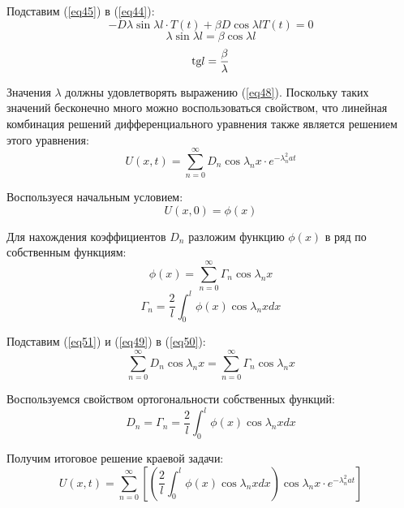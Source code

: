 Подставим (\ref{eq45}) в (\ref{eq44}):
\begin{equation}
    \label{eq46}
    - D \lambda \sin \lambda l \cdot T(t) + \beta D \cos \lambda l T(t) = 0
\end{equation}
\begin{equation}
    \label{eq47}
    \lambda \sin \lambda l = \beta \cos \lambda l
\end{equation}
\begin{equation}
    \label{eq48}
    \text{tg} l = \frac{\beta}{\lambda}
\end{equation}

Значения $\lambda$ должны удовлетворять выражению (\ref{eq48}). Поскольку таких значений бесконечно много можно воспользоваться свойством, что линейная комбинация решений дифференциального уравнения также является решением этого уравнения:
\begin{equation}
    \label{eq49}
    U(x, t) = \sum_{n = 0}^{\infty} D_n \cos \lambda_n x \cdot e^{- \lambda_n^2 a t}
\end{equation}

Воспользуеся начальным условием:
\begin{equation}
    \label{eq50}
    U(x, 0) = \phi (x)
\end{equation}

Для нахождения коэффициентов $D_n$ разложим функцию $\phi (x)$ в ряд по собственным функциям:
\begin{equation}
    \label{eq51}
    \phi (x) = \sum_{n = 0}^{\infty} \Gamma_n \cos \lambda_n x
\end{equation}
\begin{equation}
    \label{eq52}
    \Gamma_n = \frac{2}{l} \int_{0}^{l} \phi(x) \cos \lambda_n x dx
\end{equation}

Подставим (\ref{eq51}) и (\ref{eq49}) в (\ref{eq50}):
\begin{equation}
    \label{eq53}
    \sum_{n = 0}^{\infty} D_n \cos \lambda_n x = \sum_{n = 0}^{\infty} \Gamma_n \cos \lambda_n x
\end{equation}

Воспользуемся свойством ортогональности собственных функций:
\begin{equation}
    \label{eq54}
    D_n = \Gamma_n = \frac{2}{l} \int_{0}^{l} \phi(x) \cos \lambda_n x dx
\end{equation}

Получим итоговое решение краевой задачи:
\begin{equation}
    \label{eq55}
    U(x, t) = \sum_{n = 0}^{\infty} \left[ \left( \frac{2}{l} \int_{0}^{l} \phi(x) \cos \lambda_n x dx \right) \cos \lambda_n x \cdot e^{- \lambda_n^2 a t} \right]
\end{equation}